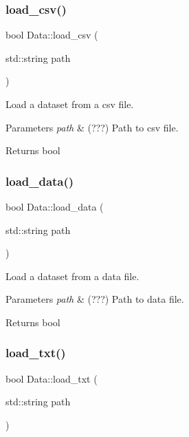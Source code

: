 \subsubsection{\texorpdfstring{load\+\_\+csv()}{load\_csv()}}
{\footnotesize\ttfamily bool Data\+::load\+\_\+csv (\begin{DoxyParamCaption}\item[{std\+::string}]{path }\end{DoxyParamCaption})}



Load a dataset from a csv file. 


\begin{DoxyParams}{Parameters}
{\em path} & (???) Path to csv file. \\
\hline
\end{DoxyParams}
\begin{DoxyReturn}{Returns}
bool 
\end{DoxyReturn}
\mbox{\label{class_data_a327bed527832d41a227f360c0beb838b}} 
\subsubsection{\texorpdfstring{load\+\_\+data()}{load\_data()}}
{\footnotesize\ttfamily bool Data\+::load\+\_\+data (\begin{DoxyParamCaption}\item[{std\+::string}]{path }\end{DoxyParamCaption})}



Load a dataset from a data file. 


\begin{DoxyParams}{Parameters}
{\em path} & (???) Path to data file. \\
\hline
\end{DoxyParams}
\begin{DoxyReturn}{Returns}
bool 
\end{DoxyReturn}
\mbox{\label{class_data_a555ae0bc506ec70f7c0411604ca6406b}} 
\subsubsection{\texorpdfstring{load\+\_\+txt()}{load\_txt()}}
{\footnotesize\ttfamily bool Data\+::load\+\_\+txt (\begin{DoxyParamCaption}\item[{std\+::string}]{path }\end{DoxyParamCaption})}



